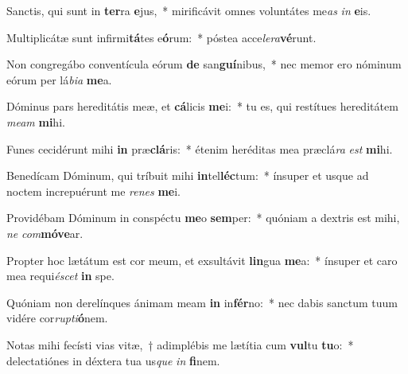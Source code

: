 \item Sanctis, qui sunt in \textbf{ter}ra \textbf{e}jus,~* mirificávit omnes voluntátes me\textit{as} \textit{in} \textbf{e}is.
\item Multiplicátæ sunt infirmi\textbf{tá}tes e\textbf{ó}rum:~* póstea acce\textit{le}\textit{ra}\textbf{vé}runt.
\item Non congregábo conventícula eórum \textbf{de} san\textbf{guí}nibus,~* nec memor ero nóminum eórum per lá\textit{bi}\textit{a} \textbf{me}a.
\item Dóminus pars hereditátis meæ, et \textbf{cá}licis \textbf{me}i:~* tu es, qui restítues hereditátem \textit{me}\textit{am} \textbf{mi}hi.
\item Funes cecidérunt mihi \textbf{in} præ\textbf{clá}ris:~* étenim heréditas mea præclá\textit{ra} \textit{est} \textbf{mi}hi.
\item Benedícam Dóminum, qui tríbuit mihi \textbf{in}tel\textbf{léc}tum:~* ínsuper et usque ad noctem increpuérunt me \textit{re}\textit{nes} \textbf{me}i.
\item Providébam Dóminum in conspéctu \textbf{me}o \textbf{sem}per:~* quóniam a dextris est mihi, \textit{ne} \textit{com}\textbf{mó}\textbf{ve}ar.
\item Propter hoc lætátum est cor meum, et exsultávit \textbf{lin}gua \textbf{me}a:~* ínsuper et caro mea requi\textit{é}\textit{scet} \textbf{in} spe.
\item Quóniam non derelínques ánimam meam \textbf{in} in\textbf{fér}no:~* nec dabis sanctum tuum vidére cor\textit{rup}\textit{ti}\textbf{ó}nem.
\item Notas mihi fecísti vias vitæ,~† adimplébis me lætítia cum \textbf{vul}tu \textbf{tu}o:~* delectatiónes in déxtera tua us\textit{que} \textit{in} \textbf{fi}nem.
